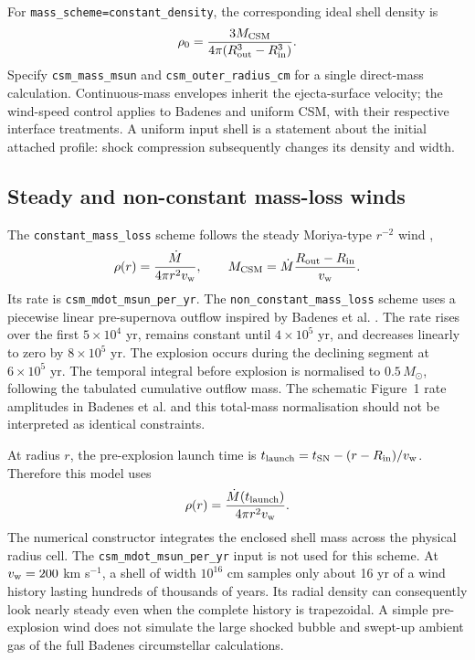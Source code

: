 \documentclass[11pt,a4paper]{article}
\newcommand{\code}[1]{\nolinkurl{#1}}
\newcommand{\Msun}{M_{\odot}}
\begin{document}
For \code{mass_scheme=constant_density}, the corresponding ideal shell density is
\begin{equation}
 \rho_0=\frac{3M_{\rm CSM}}{4\pi(R_{\rm out}^3-R_{\rm in}^3)} .
 \label{eq:uniform}
\end{equation}
Specify \code{csm_mass_msun} and \code{csm_outer_radius_cm} for a single direct-mass calculation. Continuous-mass envelopes inherit the ejecta-surface velocity; the wind-speed control applies to Badenes and uniform CSM, with their respective interface treatments. A uniform input shell is a statement about the initial attached profile: shock compression subsequently changes its density and width.

\subsection{Steady and non-constant mass-loss winds}
The \code{constant_mass_loss} scheme follows the steady Moriya-type $r^{-2}$ wind \cite{moriya2023},
\begin{equation}
 \rho(r)=\frac{\dot M}{4\pi r^2v_{\rm w}},\qquad
 M_{\rm CSM}=\dot M\frac{R_{\rm out}-R_{\rm in}}{v_{\rm w}} .
 \label{eq:wind}
\end{equation}
Its rate is \code{csm_mdot_msun_per_yr}. The \code{non_constant_mass_loss} scheme uses a piecewise linear pre-supernova outflow inspired by Badenes et al. \cite{badenes2007}. The rate rises over the first $5\times10^4$ yr, remains constant until $4\times10^5$ yr, and decreases linearly to zero by $8\times10^5$ yr. The explosion occurs during the declining segment at $6\times10^5$ yr. The temporal integral before explosion is normalised to $0.5\,\Msun$, following the tabulated cumulative outflow mass. The schematic Figure~1 rate amplitudes in Badenes et al. and this total-mass normalisation should not be interpreted as identical constraints.

At radius $r$, the pre-explosion launch time is $t_{\rm launch}=t_{\rm SN}-(r-R_{\rm in})/v_{\rm w}$. Therefore this model uses
\begin{equation}
 \rho(r)=\frac{\dot M(t_{\rm launch})}{4\pi r^2v_{\rm w}} .
 \label{eq:variablewind}
\end{equation}
The numerical constructor integrates the enclosed shell mass across the physical radius cell. The \code{csm_mdot_msun_per_yr} input is not used for this scheme. At $v_{\rm w}=200$ km s$^{-1}$, a shell of width $10^{16}$ cm samples only about 16 yr of a wind history lasting hundreds of thousands of years. Its radial density can consequently look nearly steady even when the complete history is trapezoidal. A simple pre-explosion wind does not simulate the large shocked bubble and swept-up ambient gas of the full Badenes circumstellar calculations.
\end{document}
